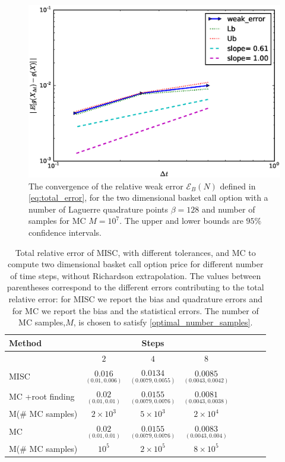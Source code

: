 \FloatBarrier
\begin{figure}[h!]
		\centering
		\includegraphics[width=0.4\linewidth]{./figures/basket_call_2d_time_stepping/weak_convergence/weak_convergence_order_basket_option_2d_relative_M_10_7_beta_128}

	\caption{The convergence of the relative weak error  $\mathcal{E}_B(N)$ defined in \ref{eq:total_error}, for the two dimensional basket call option with  a number of Laguerre  quadrature points  $\beta=128$ and number of samples for MC $M=10^7$. The upper and lower bounds are $95\%$ confidence intervals.}
	\label{fig:Weak_rate_two_dim_basket}
\end{figure}
\FloatBarrier


\FloatBarrier
\begin{table}[h!]
	\centering
	\begin{tabular}{l*{6}{c}r}
		\toprule[1.5pt]
	Method & & Steps  & &     \\
	\hline
           & $2$ & $4$ & $8$   \\
		\hline
		MISC   &  $\underset{(0.01,0.006)}{\mathbf{0.016}}$ & $\underset{(0.0079,0.0055)}{\mathbf{0.0134}}$ & $\underset{(0.0043,0.0042)}{\mathbf{0.0085}}$   \\

		\hline		
			MC +root finding   &  $\underset{(0.01,0.01)}{\mathbf{0.02}}$ & $\underset{(0.0079,0.0076)}{\mathbf{0.0155}}$ & $\underset{(0.0043,0.0038)}{\mathbf{0.0081}}$  \\
			M(\# MC samples)   & $2 \times 10^3$   &  $5 \times 10^3$ & $2 \times 10^4$  \\	
		\hline	
				MC   &  $\underset{(0.01,0.01)}{\mathbf{0.02}}$ & $\underset{(0.0079,0.0076)}{\mathbf{0.0155}}$ & $\underset{(0.0043,0.004)}{\mathbf{0.0083}}$   \\	
				M(\# MC samples)   &$10^5$  & $2 \times 10^5$  &  $8 \times 10^5$\\	
		
			\bottomrule[1.25pt]
	\end{tabular}
	\caption{Total relative  error of MISC, with different tolerances, and MC to compute two dimensional basket call option price for different number of time steps, without Richardson extrapolation. The values between parentheses correspond to the different errors contributing to the total relative error: for MISC we report the bias and quadrature errors and for MC we report the bias and the statistical errors. The number of MC samples,$ M$, is chosen to satisfy \eqref{optimal_number_samples}.}
	\label{Total error of MISC and MC to compute two  dim basket  Call option price of the different tolerances for different number of time steps, without Richardson extrapolation. The numbers between parentheses are the corresponding absolute errors.}
\end{table}
\FloatBarrier




